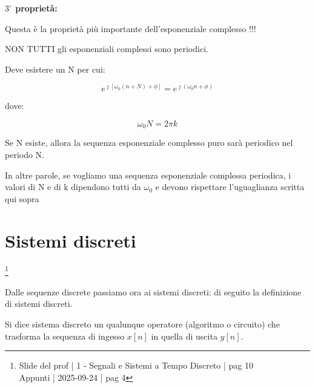\textbf{$3^{\circ}$ proprietà: } \newline 

\begin{tcolorbox}
    Questa è la proprietà più importante dell'esponenziale complesso !!!
\end{tcolorbox}

NON TUTTI gli esponenziali complessi sono periodici. \newline 

Deve esistere un N per cui: 

{
    \Large 
    \begin{equation}
        e^{\jmath \left[ \omega_0 \left( n + N\right) + \phi\right]}
        = 
        e^{\jmath \left(\omega_0 n + \phi\right)}
    \end{equation}
}

dove: 

{
    \Large 
    \begin{equation}
        \omega_0 N
        = 
        2 \pi k
    \end{equation}
}

Se N esiste, allora la sequenza esponenziale complesso puro sarà periodico nel periodo N. \newline 

\begin{tcolorbox}
    In altre parole, se vogliamo una sequenza esponenziale complessa periodica,  
    i valori di N e di k dipendono tutti da $\omega_0$ e devono rispettare l'uguaglianza scritta qui sopra
\end{tcolorbox}

\newpage 

\section{Sistemi discreti}

\footnote{ 
    Slide del prof | 1 - Segnali e Sistemi a Tempo Discreto | pag 10\\
    Appunti | 2025-09-24 | pag 4
}

Dalle sequenze discrete passiamo ora ai sistemi discreti: di seguito la definizione di sistemi discreti. \newline 

Si dice sistema discreto un qualunque operatore (algoritmo o circuito) 
che trasforma la sequenza di ingesso $x \left[ n\right]$ in quella di uscita $y \left[ n\right]$. \newline 

